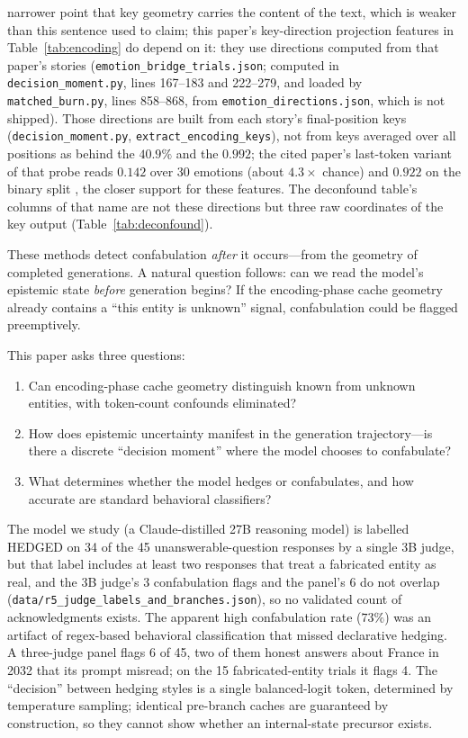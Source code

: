 \documentclass[11pt,a4paper]{article}
\begin{document}
narrower point that key geometry carries the content of the text, which
is weaker than this sentence used to claim; this paper's key-direction projection features in
Table~\ref{tab:encoding} do depend on it: they use directions computed
from that paper's stories (\texttt{emotion\_bridge\_trials.json};
computed in \texttt{decision\_moment.py}, lines 167--183 and 222--279, and
loaded by \texttt{matched\_burn.py}, lines 858--868, from
\texttt{emotion\_directions.json}, which is not shipped). Those directions are built from each story's final-position keys (\texttt{decision\_moment.py}, \texttt{extract\_encoding\_keys}), not from keys averaged over all positions as behind the $40.9\%$ and the $0.992$; the cited paper's last-token variant of that probe reads $0.142$ over 30 emotions (about $4.3\times$ chance) and $0.922$ on the binary split \citep{lyra2026usermodel}, the closer support for these features. The
deconfound table's columns of that name are not these directions but
three raw coordinates of the key output (Table~\ref{tab:deconfound}).

These methods detect confabulation \emph{after} it occurs---from the
geometry of completed generations. A natural question follows: can we
read the model's epistemic state \emph{before} generation begins? If the
encoding-phase cache geometry already contains a ``this entity is
unknown'' signal, confabulation could be flagged preemptively.

This paper asks three questions:
\begin{enumerate}[nosep]
    \item Can encoding-phase cache geometry distinguish known from
          unknown entities, with token-count confounds eliminated?
    \item How does epistemic uncertainty manifest in the generation
          trajectory---is there a discrete ``decision moment'' where the
          model chooses to confabulate?
    \item What determines whether the model hedges or confabulates, and
          how accurate are standard behavioral classifiers?
\end{enumerate}

The model we study (a Claude-distilled 27B
reasoning model) is labelled HEDGED on 34 of the 45 unanswerable-question responses by a single 3B judge, but that label includes at least two responses that treat a fabricated entity as real, and the 3B judge's 3 confabulation flags and the panel's 6 do not overlap (\texttt{data/r5\_judge\_labels\_and\_branches.json}), so no validated count of acknowledgments exists. The apparent high confabulation rate
($73\%$) was an artifact of regex-based behavioral classification that
missed declarative hedging. A three-judge panel flags 6 of 45, two of them honest answers about France in 2032 that its prompt misread; on the 15 fabricated-entity trials it flags 4. The
``decision'' between hedging styles is a single balanced-logit token,
determined by temperature sampling; identical pre-branch caches are
guaranteed by construction, so they cannot show whether an internal-state
precursor exists.
\end{document}
